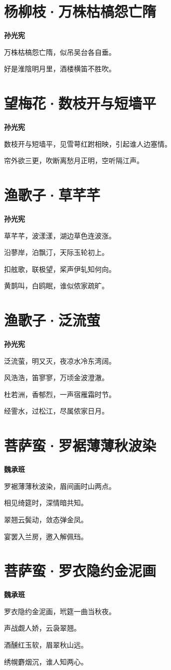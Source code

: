 \documentclass[12pt,a4paper]{ctexbook}
\begin{document}
\section{杨柳枝·万株枯槁怨亡隋}
\textbf{孙光宪}\par\vspace{0.5em}
万株枯槁怨亡隋，似吊吴台各自垂。\par
好是淮陰明月里，酒楼横笛不胜吹。\par

\section{望梅花·数枝开与短墙平}
\textbf{孙光宪}\par\vspace{0.5em}
数枝开与短墙平，见雪萼红跗相映，引起谁人边塞情。\par
帘外欲三更，吹断离愁月正明，空听隔江声。\par

\section{渔歌子·草芊芊}
\textbf{孙光宪}\par\vspace{0.5em}
草芊芊，波漾漾，湖边草色连波涨。\par
沿蓼岸，泊飘汀，天际玉轮初上。\par
扣舷歌，联极望，桨声伊轧知何向。\par
黄鹊叫，白鸥眠，谁似侬家疏旷。\par

\section{渔歌子·泛流萤}
\textbf{孙光宪}\par\vspace{0.5em}
泛流萤，明又灭，夜凉水冷东湾阔。\par
风浩浩，笛寥寥，万顷金波澄澈。\par
杜若洲，香郁烈，一声宿雁霜时节。\par
经霅水，过松江，尽属侬家日月。\par

\section{菩萨蛮·罗裾薄薄秋波染}
\textbf{魏承班}\par\vspace{0.5em}
罗裾薄薄秋波染，眉间画时山两点。\par
相见绮筵时，深情暗共知。\par
翠翘云鬓动，敛态弹金凤。\par
宴罢入兰房，邀入解佩珰。\par

\section{菩萨蛮·罗衣隐约金泥画}
\textbf{魏承班}\par\vspace{0.5em}
罗衣隐约金泥画，玳筵一曲当秋夜。\par
声战觑人娇，云袅翠翘。\par
酒醺红玉软，眉翠秋山远。\par
绣幌麝烟沉，谁人知两心。\par
\end{document}
